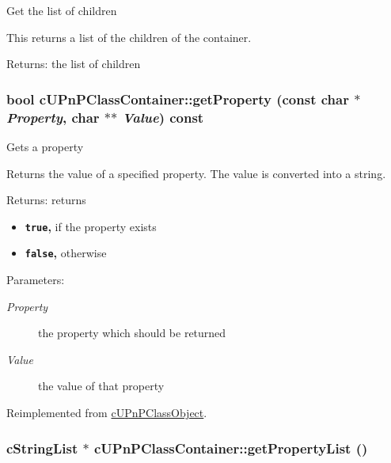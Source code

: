 Get the list of children

This returns a list of the children of the container.

\begin{Desc}
\item[Returns:]the list of children \end{Desc}
\hypertarget{classcUPnPClassContainer_f70297d2275e083f05024524d21118d7}{
\subsubsection[{getProperty}]{\setlength{\rightskip}{0pt plus 5cm}bool cUPnPClassContainer::getProperty (const char $\ast$ {\em Property}, \/  char $\ast$$\ast$ {\em Value}) const}}
\label{classcUPnPClassContainer_f70297d2275e083f05024524d21118d7}


Gets a property

Returns the value of a specified property. The value is converted into a string.

\begin{Desc}
\item[Returns:]returns\begin{itemize}
\item {\bf {\tt true},} if the property exists\item {\bf {\tt false},} otherwise \end{itemize}
\end{Desc}
\begin{Desc}
\item[Parameters:]
\begin{description}
\item[{\em Property}]the property which should be returned \item[{\em Value}]the value of that property \end{description}
\end{Desc}


Reimplemented from \hyperlink{classcUPnPClassObject_539cf36abc96b95bc8437601fed8a0f6}{cUPnPClassObject}.\hypertarget{classcUPnPClassContainer_d952c993314a9352d13f644bb95fbdc2}{
\subsubsection[{getPropertyList}]{\setlength{\rightskip}{0pt plus 5cm}cStringList $\ast$ cUPnPClassContainer::getPropertyList ()}}
\label{classcUPnPClassContainer_d952c993314a9352d13f644bb95fbdc2}


